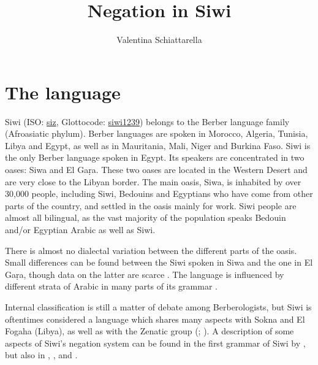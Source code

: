 \documentclass[output=paper,colorlinks,citecolor=brown]{langscibook}
\author{Valentina Schiattarella\affiliation{University of Naples, L'Orientale}}%
\title{Negation in Siwi}
\begin{document}
\maketitle 

\section{The language}\label{sec:siw:1}
Siwi (ISO: \href{https://iso639-3.sil.org/code/siz}{siz}, Glottocode: \href{https://glottolog.org/resource/languoid/id/siwi1239}{siwi1239}) belongs to the Berber language family (Afroasiatic phylum). Berber languages are spoken in Morocco, Algeria, Tunisia, Libya and Egypt, as well as in Mauritania, Mali, Niger and Burkina Faso. Siwi is the only Berber language spoken in Egypt. Its speakers are concentrated in two oases: Siwa and El Gaṛa. These two oases are located in the Western Desert and are very close to the Libyan border. The main oasis, Siwa, is inhabited by over 30,000 people, including Siwi, Bedouins and Egyptians who have come from other parts of the country, and settled in the oasis mainly for work. Siwi people are almost all bilingual, as the vast majority of the population speaks Bedouin and/or Egyptian Arabic as well as Siwi. 

There is almost no dialectal variation between the different parts of the oasis. Small differences can be found between the Siwi spoken in Siwa and the one in El Gaṛa, though data on the latter are scarce \citep[102--109]{Schiattarella2017}. The language is influenced by different strata of Arabic in many parts of its grammar \citep{Souag2013}. 

Internal classification is still a matter of debate among Berberologists, but Siwi is oftentimes considered a language which shares many aspects with Sokna and El Fogaha (Libya), as well as with the Zenatic group (\citealt{Souag2013}; \citealt{Kossmann2020}). A description of some aspects of Siwi’s negation system can be found in the first grammar of Siwi by \citet[48--49]{Laoust1931}, but also in \citet{Leguil1986}, \citet[224, 230, 244]{Vycichl2005}, \citet[209--214]{Souag2013} and \citet{Schiattarella2015}.
\end{document}
